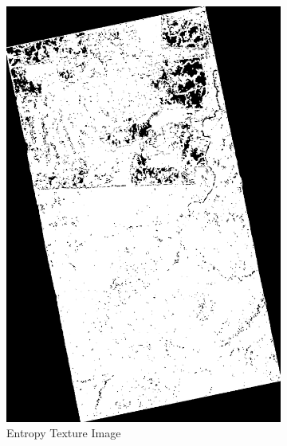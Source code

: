 \begin{figure}[H]
\begin{subfigure}[b]{0.4\linewidth}
      \includegraphics[width=\linewidth]{Cap3-Results/sum_and_diff_textures/entropyimage.png}
       \caption{Entropy Texture Image}
    \end{subfigure}
    \centering
    \begin{subfigure}[b]{0.4\linewidth}

\end{subfigure}
\end{figure}
